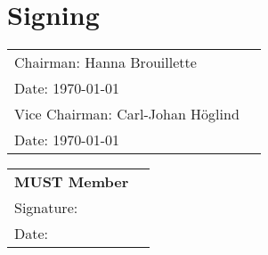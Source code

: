 \section*{Signing}
    \begin{table}[H]
        \begin{tabularx}{\columnwidth}{XX}
            \hline
            Chairman: \alert{Hanna Brouillette} \\ Date: \today  \vspace{.5cm} \\ 
            Vice Chairman: \alert{Carl-Johan Höglind} \\ Date: \today \vspace{.5cm}\\ 
            \hline 
        \end{tabularx}
    \end{table}
    
    
    \begin{table}[H]
        \begin{tabularx}{\columnwidth}{|X|X|}
            \hline
            \multicolumn{1}{|c|}{\textbf{\large MUST Member}}\\
            \vspace{.5cm} Signature: \vspace{1cm} \\ Date: \vspace{.5cm} \\ 
            \hline 
        \end{tabularx}
    \end{table}
    
